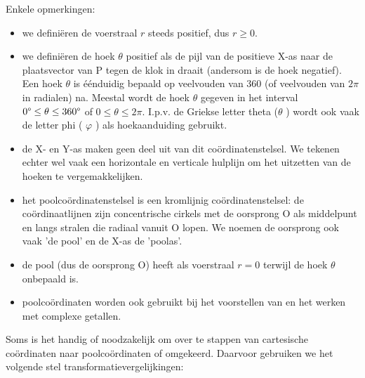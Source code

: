 Enkele opmerkingen:
\begin{itemize}
\item we defini\"eren de voerstraal $r$ steeds positief, dus $r\geq0$.
\item we defini\"eren de hoek $\theta$ positief als de pijl van de positieve
X-as naar de plaatsvector van P tegen de klok in draait (andersom
is de hoek negatief). Een hoek $\theta$ is \'e\'enduidig bepaald op veelvouden
van 360\textdegree{} (of veelvouden van $2\pi$ in radialen) na. Meestal
wordt de hoek $\theta$ gegeven in het interval $0\text{\textdegree}\leq\theta\leq360\text{\textdegree}$
of $0\leq\theta\leq2\pi$. I.p.v. de Griekse letter theta ($\theta$
) wordt ook vaak de letter phi ( $\varphi$ ) als hoekaanduiding gebruikt.
\item de X- en Y-as maken geen deel uit van dit co\"ordinatenstelsel. We tekenen
echter wel vaak een horizontale en verticale hulplijn om het uitzetten
van de hoeken te vergemakkelijken.
\item het poolco\"ordinatenstelsel is een kromlijnig co\"ordinatenstelsel: de
co\"ordinaatlijnen zijn concentrische cirkels met de oorsprong O als
middelpunt en langs stralen die radiaal vanuit O lopen. We noemen
de oorsprong ook vaak 'de pool' en de X-as de 'poolas'.
\item de pool (dus de oorsprong O) heeft als voerstraal $r=0$ terwijl de
hoek $\theta$ onbepaald is.
\item poolco\"ordinaten worden ook gebruikt bij het voorstellen van en het
werken met complexe getallen.
\end{itemize}


\noindent Soms is het handig of noodzakelijk om over te stappen van
cartesische co\"ordinaten naar poolco\"ordinaten of omgekeerd. Daarvoor
gebruiken we het volgende stel transformatievergelijkingen:

